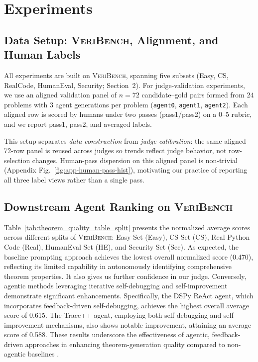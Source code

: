 \documentclass{article}
\begin{document}
\section{Experiments}
\subsection{Data Setup: \textsc{VeriBench}, Alignment, and Human Labels}
All experiments are built on \textsc{VeriBench}, spanning five subsets (Easy, CS, RealCode, HumanEval, Security; Section~2).
For judge-validation experiments, we use an aligned validation panel of \(n=72\) candidate--gold pairs formed from \(24\) problems with \(3\) agent generations per problem (\texttt{agent0}, \texttt{agent1}, \texttt{agent2}).
Each aligned row is scored by humans under two passes (pass1/pass2) on a \(0\)--\(5\) rubric, and we report pass1, pass2, and averaged labels.

This setup separates \emph{data construction} from \emph{judge calibration}: the same aligned 72-row panel is reused across judges so trends reflect judge behavior, not row-selection changes.
Human-pass dispersion on this aligned panel is non-trivial (Appendix Fig.~\ref{fig:app-human-pass-hist}), motivating our practice of reporting all three label views rather than a single pass.

\subsection{Downstream Agent Ranking on \textsc{VeriBench}}
Table~\ref{tab:theorem_quality_table_split} presents the normalized average scores across different splits of \textsc{VeriBench}: Easy Set (Easy), CS Set (CS), Real Python Code (Real), HumanEval Set (HE), and Security Set (Sec).
As expected, the baseline prompting approach achieves the lowest overall normalized score (0.470), reflecting its limited capability in autonomously identifying comprehensive theorem properties.
It also gives us further confidence in our judge.
Conversely, agentic methods leveraging iterative self-debugging and self-improvement demonstrate significant enhancements.
Specifically, the DSPy ReAct agent, which incorporates feedback-driven self-debugging, achieves the highest overall average score of 0.615.
The Trace++ agent, employing both self-debugging and self-improvement mechanisms, also shows notable improvement, attaining an average score of 0.588.
These results underscore the effectiveness of agentic, feedback-driven approaches in enhancing theorem-generation quality compared to non-agentic baselines \citep{khattab2024dspy,cheng2024trace,chen2021evaluating}.
\end{document}
